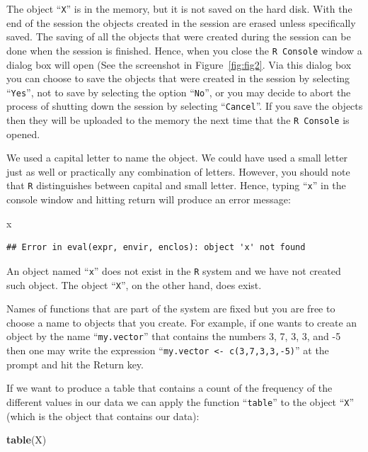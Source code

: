 \documentclass[]{krantz}
\makeatletter
\newenvironment{Shaded}{\begin{snugshade}}{\end{snugshade}}
\newcommand{\KeywordTok}[1]{\textcolor[rgb]{0.13,0.29,0.53}{\textbf{#1}}}
\newcommand{\NormalTok}[1]{#1}
\newenvironment{kframe}{%
\medskip{}
\setlength{\fboxsep}{.8em}
 \def\at@end@of@kframe{}%
 \ifinner\ifhmode%
  \def\at@end@of@kframe{\end{minipage}}%
  \begin{minipage}{\columnwidth}%
 \fi\fi%
 \def\FrameCommand##1{\hskip\@totalleftmargin \hskip-\fboxsep
 \colorbox{shadecolor}{##1}\hskip-\fboxsep
     \hskip-\linewidth \hskip-\@totalleftmargin \hskip\columnwidth}%
 \MakeFramed {\advance\hsize-\width
   \@totalleftmargin\z@ \linewidth\hsize
   \@setminipage}}%
 {\par\unskip\endMakeFramed%
 \at@end@of@kframe}
\renewenvironment{Shaded}{\begin{kframe}}{\end{kframe}}
\theoremstyle{definition}
\theoremstyle{definition}
\theoremstyle{definition}
\theoremstyle{remark}
\makeatother
\begin{document}
The object ``\texttt{X}'' is in the memory, but it is not saved on the hard disk.
With the end of the session the objects created in the session are
erased unless specifically saved. The saving of all the objects that
were created during the session can be done when the session is
finished. Hence, when you close the \texttt{R\ Console} window a dialog box will
open (See the screenshot in Figure~\ref{fig:fig2}. Via this dialog
box you can choose to save the objects that were created in the session
by selecting ``\texttt{Yes}'', not to save by selecting the option ``\texttt{No}'', or you
may decide to abort the process of shutting down the session by
selecting ``\texttt{Cancel}''. If you save the objects then they will be uploaded
to the memory the next time that the \texttt{R\ Console} is opened.

We used a capital letter to name the object. We could have used a small
letter just as well or practically any combination of letters. However,
you should note that \texttt{R} distinguishes between capital and small letter.
Hence, typing ``\texttt{x}'' in the console window and hitting return will
produce an error message:

\begin{Shaded}
\begin{Highlighting}[]
\NormalTok{x}
\end{Highlighting}
\end{Shaded}

\begin{verbatim}
## Error in eval(expr, envir, enclos): object 'x' not found
\end{verbatim}

An object named ``\texttt{x}'' does not exist in the \texttt{R} system and we have not
created such object. The object ``\texttt{X}'', on the other hand, does exist.

Names of functions that are part of the system are fixed but you are
free to choose a name to objects that you create. For example, if one
wants to create an object by the name ``\texttt{my.vector}'' that contains the
numbers 3, 7, 3, 3, and -5 then one may write the expression
``\texttt{my.vector\ \textless{}-\ c(3,7,3,3,-5)}'' at the prompt and hit the Return key.

If we want to produce a table that contains a count of the frequency of
the different values in our data we can apply the function ``\texttt{table}'' to
the object ``\texttt{X}'' (which is the object that contains our data):

\begin{Shaded}
\begin{Highlighting}[]
\KeywordTok{table}\NormalTok{(X)}
\end{Highlighting}
\end{Shaded}
\end{document}
